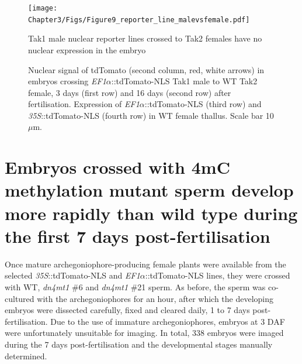 \begin{figure}[htbp!] 
\centering    
    \texttt{[image: Chapter3/Figs/Figure9\_reporter\_line\_malevsfemale.pdf]}
\caption{Tak1 male nuclear reporter lines crossed to Tak2 females have no nuclear expression in the embryo}
\label{fig:malevsfemale}
\captionsetup{font=small}
    \caption*{Nuclear signal of tdTomato (second column, red, white arrows) in embryos crossing \textit{EF1$\alpha$}::tdTomato-NLS Tak1 male to WT Tak2 female, 3 days (first row) and 16 days (second row) after fertilisation. Expression of \textit{EF1$\alpha$}::tdTomato-NLS (third row) and  \textit{35S}::tdTomato-NLS (fourth row) in WT female thallus. Scale bar 10$\mu$m.}
\end{figure}

\section{Embryos crossed with 4mC methylation mutant sperm develop more rapidly than wild type during the first 7 days post-fertilisation}

Once mature archegoniophore-producing female plants were available from the selected \textit{35S}::tdTomato-NLS and \textit{EF1$\alpha$}::tdTomato-NLS lines, they were crossed with WT, \textit{dn4mt1} \#6 and \textit{dn4mt1} \#21 sperm. As before, the sperm was co-cultured with the archegoniophores for an hour, after which the developing embryos were dissected carefully, fixed and cleared daily, 1 to 7 days post-fertilisation. Due to the use of immature archegoniophores, embryos at 3 DAF were unfortunately unsuitable for imaging. In total, 338 embryos were imaged during the 7 days post-fertilisation and the developmental stages manually determined. 

